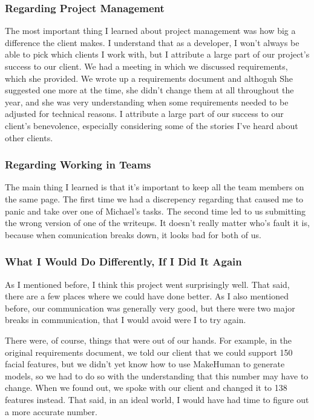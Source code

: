 \documentclass[letterpaper,10pt, onecolumn, draftclsnofoot]{IEEEtran}
\begin{document}
\subsubsection{Regarding Project Management}
The most important thing I learned about project management was how big a difference the client makes. I understand that as a developer, I won't always be able to pick which clients I work with, but I attribute a large part of our project's success to our client. We had a meeting in which we discussed requirements, which she provided. We wrote up a requirements document and althoguh She suggested one more at the time, she didn't change them at all throughout the year, and she was very understanding when some requirements needed to be adjusted for technical reasons. I attribute a large part of our success to our client's benevolence, especially considering some of the stories I've heard about other clients.

\subsubsection{Regarding Working in Teams}
The main thing I learned is that it's important to keep all the team members on the same page. The first time we had a discrepency regarding that caused me to panic and take over one of Michael's tasks. The second time led to us submitting the wrong version of one of the writeups. It doesn't really matter who's fault it is, because when comunication breaks down, it looks bad for both of us.

\subsubsection{What I Would Do Differently, If I Did It Again}
As I mentioned before, I think this project went surprisingly well. That said, there are a few places where we could have done better. As I also mentioned before, our communication was generally very good, but there were two major breaks in communication, that I would avoid were I to try again. 

There were, of course, things that were out of our hands. For example, in the original requirements document, we told our client that we could support 150 facial features, but we didn't yet know how to use MakeHuman to generate models, so we had to do so with the understanding that this number may have to change. When we found out, we spoke with our client and changed it to 138 features instead. That said, in an ideal world, I would have had time to figure out a more accurate number.
\end{document}

